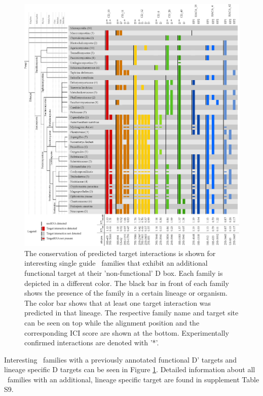 \begin{figure}
  \centering
  \includegraphics[width=\textwidth]{pics/conservation_lineage_specific_targets.eps}
  \caption{The conservation of predicted target interactions is shown for
    interesting single guide \cd\ families that exhibit an additional
    functional target at their 'non-functional' D box. Each family is
    depicted in a different color. The black bar in front of each
    family shows the presence of the family in a certain lineage or
    organism. The color bar shows that at least one target interaction
    was predicted in that lineage. The respective family name and target
    site can be seen on top while the alignment position and the
    corresponding ICI score are shown at the bottom. Experimentally
    confirmed interactions are denoted with '*'.}
  \label{fig:additional_targets}
\end{figure}

Interesting \cd\ families with a previously annotated functional D'
targets and lineage specific D targets can be seen in Figure
\ref{fig:additional_targets}. Detailed information about all \sno\
families with an additional, lineage specific target are found in supplement Table S9.

